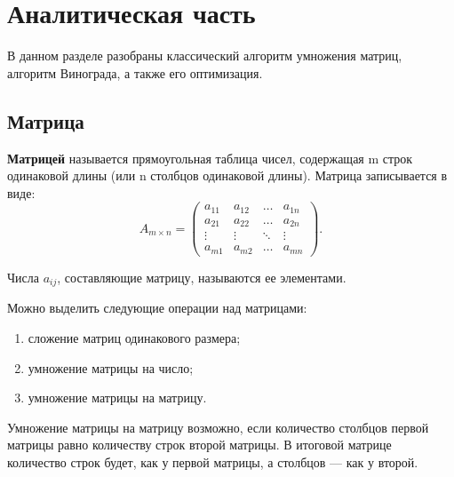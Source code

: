\chapter{Аналитическая часть}

В данном разделе разобраны классический алгоритм умножения матриц, алгоритм Винограда, а также его оптимизация.


\section{Матрица}
\textbf{Матрицей} \cite{matrix} называется прямоугольная таблица чисел, содержащая m строк одинаковой длины (или n столбцов одинаковой длины). Матрица записывается в виде:
\begin{equation}
	A_{m \times n} = 
	\begin{pmatrix}
		a_{11} & a_{12} & \ldots & a_{1n}\\
		a_{21} & a_{22} & \ldots & a_{2n}\\
		\vdots & \vdots & \ddots & \vdots\\
		a_{m1} & a_{m2} & \ldots & a_{mn}
	\end{pmatrix}.
\end{equation}

Числа $a_{ij}$, составляющие матрицу, называются ее элементами. 

Можно выделить следующие операции над матрицами:
\begin{enumerate}
	\item сложение матриц одинакового размера;
	\item умножение матрицы на число;
	\item умножение матрицы на матрицу. 
\end{enumerate}

Умножение матрицы на матрицу возможно, если количество столбцов первой матрицы равно количеству строк второй матрицы. В итоговой матрице количество строк будет, как у первой матрицы, а столбцов --- как у второй.

